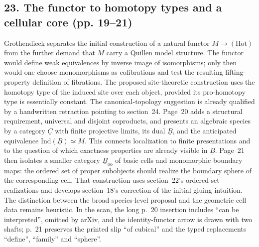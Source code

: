 \subsection*{23. The functor to homotopy types and a cellular core (pp. 19--21)}
Grothendieck separates the initial construction of a natural functor $M\to(\mathrm{Hot})$ from the further demand that $M$ carry a Quillen model structure. The functor would define weak equivalences by inverse image of isomorphisms; only then would one choose monomorphisms as cofibrations and test the resulting lifting-property definition of fibrations. The proposed site-theoretic construction uses the homotopy type of the induced site over each object, provided its pro-homotopy type is essentially constant. The canonical-topology suggestion is already qualified by a handwritten retraction pointing to section~24. Page~20 adds a structural requirement, universal and disjoint coproducts, and presents an algebraic species by a category $\underline C$ with finite projective limits, its dual $\underline B$, and the anticipated equivalence $\mathrm{Ind}(\underline B)\simeq M$. This connects localization to finite presentations and to the question of which exactness properties are already visible in $\underline B$. Page~21 then isolates a smaller category $\underline B_{\mathrm{oo}}$ of basic cells and monomorphic boundary maps: the ordered set of proper subobjects should realize the boundary sphere of the corresponding cell. That construction uses section~22's ordered-set realizations and develops section~18's correction of the initial gluing intuition. The distinction between the broad species-level proposal and the geometric cell data remains heuristic. In the scan, the long p.~20 insertion includes ``can be interpreted'', omitted by arXiv, and the identity-functor arrow is drawn with two shafts; p.~21 preserves the printed slip ``of cubical'' and the typed replacements ``define'', ``family'' and ``sphere''.

